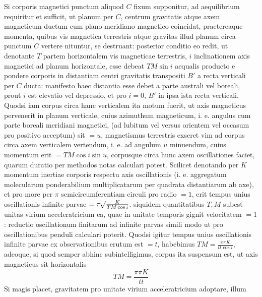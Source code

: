 Si corporis magnetici punctum aliquod $C$ fixum supponitur, ad aequilibrium requiritur et sufficit, ut planum per $C$, centrum gravitatis atque axem magneticum ductum cum plano meridiano magnetico coincidat, praetereaque momenta, quibus vis magnetica terrestris atque gravitas illud planum circa punctum $C$ vertere nituntur, se destruant: posterior conditio eo redit, ut denotante $T$ partem horizontalem vis magneticae terrestris, $i$ inclinationem axis magnetici ad planum horizontale, esse debeat $TM\sin i$ aequalis producto e pondere corporis in distantiam centri gravitatis transpositi $B'$ a recta verticali per $C$ ducta: manifesto haec distantia esse debet a parte australi vel boreali, prout $i$ est elevatio vel depressio, et pro $i=0$, $B'$ in ipsa ista recta verticali. Quodsi iam corpus circa hanc verticalem ita motum fuerit, ut axis magneticus pervenerit in planum verticale, cuius azimuthum magneticum, i. e. angulus cum parte boreali meridiani magnetici, (ad lubitum vel versus orientem vel occasum pro positivo acceptum) sit $=u$, magnetismus terrestris exseret vim ad corpus circa axem verticalem vertendum, i. e. ad angulum $u$ minuendum, cuius momentum erit $=TM\cos i\sin u$, corpusque circa hunc axem oscillationes faciet, quarum duratio per methodos notas calculari potest. Scilicet denotando per $K$ momentum inertiae corporis respectu axis oscillationis (i. e. aggregatum molecularum ponderabilium multiplicatarum per quadrata distantiarum ab axe), et pro more per $\pi$ semicircumferentiam circuli pro radio $=1$, erit tempus unius oscillationis infinite parvae $=\pi\mathord{{}^{}\!\surd}\frac{K}{TM\cos i}$. siquidem quantitatibus $T,M$ subest unitas virium acceleratricium ea, quae in unitate temporis gignit velocitatem $=1$: reductio oscillationum finitarum ad infinite parvas simili modo ut pro oscillationibus penduli calculari poterit. Quodsi igitur tempus unius oscillationis infinite parvae ex observationibus erutum est $=t$, habebimus $TM=\frac{\pi\pi K}{tt\cos i}$, adeoque, si quod semper abhinc subintelligimus, corpus ita suspensum est, ut axis magneticus sit horizontalis
\[
TM=\frac{\pi\pi K}{tt}
\]
Si magis placet, gravitatem pro unitate virium acceleratricium adoptare, illum
